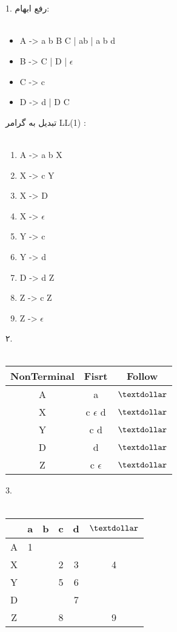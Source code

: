 
\\
\\
1.
 رفع ابهام:
\\
\\
\begin{latin}
	\begin{itemize}
		\item
		A -> a b B C | ab | a b d
		\item
		B -> C | D | {$\epsilon$}
		\item
		C -> c
		\item
		D -> d | D C
	\end{itemize}
\end{latin}
تبدیل به گرامر LL(1)
:
\\
\\
\begin{latin}
	\begin{enumerate}
		\item
		A -> a b X
		\item
		X -> c Y
		\item
		X -> D
		\item
		X -> {$\epsilon$}
		\item
		Y -> c
		\item
		Y -> d
		\item
		D -> d Z
		\item
		Z -> c Z
		\item
		Z -> {$\epsilon$}
	\end{enumerate}
\end{latin}
۲.
\\
\\
\begin{latin}
 \begin{tabular}{||c c c||} 
 \hline
 NonTerminal & Fisrt & Follow  \\ [0.5ex] 
 \hline\hline
 A & a & {$\textdollar$} \\ 
 \hline
 X & c {$\epsilon$} d & {$\textdollar$}\\
 \hline
 Y & c d & {$\textdollar$}\\
 \hline
 D & d & {$\textdollar$}\\
 \hline
 Z & c {$\epsilon$}  & {$\textdollar$}\\ [1ex] 
 \hline
\end{tabular}
\end{latin}
3.
\\
\\
\begin{latin}
 \begin{tabular}{||c c c c c c||} 
 \hline
  & a & b & c & d & {$\textdollar$}\\ [0.5ex] 
 \hline\hline
 A & 1 & & & &\\ 
 \hline
 X &  & & 2 & 3 & 4\\
 \hline
 Y & & & 5 & 6 & \\
 \hline
 D & & & & 7 &\\
 \hline
 Z & & & 8 & & 9\\ [1ex] 
 \hline
\end{tabular}
\end{latin}
